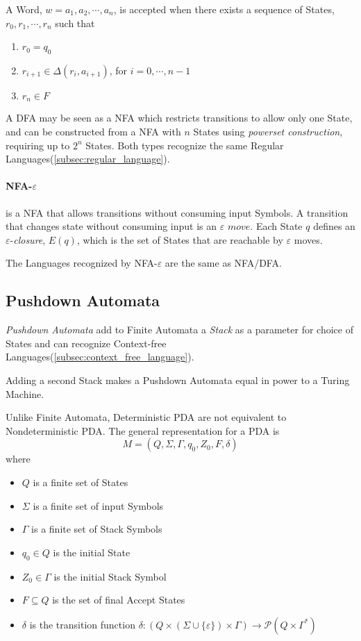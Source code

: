 \documentclass{article}
\begin{document}
A Word, $w=a_1,a_2,\cdots,a_n$, is accepted when there exists a
sequence of States, $r_0,r_1,\cdots,r_n$ such that
\begin{enumerate}
\item $r_0 = q_0$
\item $r_{i+1} \in \Delta(r_i, a_{i+1})$, for $i = 0, \cdots, n-1$
\item $r_n \in F$
\end{enumerate}

A DFA may be seen as a NFA which restricts transitions to allow only
one State, and can be constructed from a NFA with $n$ States using
\emph{powerset construction}, requiring up to $2^n$ States. Both types
recognize the same Regular Languages(\ref{subsec:regular_language}).

\paragraph{NFA-$\varepsilon$} is a NFA that allows transitions
without consuming input Symbols. A transition that changes state
without consuming input is an $\varepsilon$ $move$. Each State $q$
defines an $\varepsilon$-\emph{closure}, $E(q)$, which is the set of
States that are reachable by $\varepsilon$ moves.

The Languages recognized by NFA-$\varepsilon$ are the same as NFA/DFA.

\subsection{Pushdown Automata}\label{subsec:pushdown_automata}
\emph{Pushdown Automata} add to Finite Automata a \emph{Stack} as a
parameter for choice of States and can recognize Context-free
Languages(\ref{subsec:context_free_language}).

Adding a second Stack makes a Pushdown Automata equal in power to a
Turing Machine.

Unlike Finite Automata, Deterministic PDA are not equivalent to
Nondeterministic PDA. The general representation for a PDA is
\[
    M = (Q, \Sigma, \Gamma, q_0, Z_0, F, \delta)
\]
where
\begin{itemize}
\item $Q$ is a finite set of States
\item $\Sigma$ is a finite set of input Symbols
\item $\Gamma$ is a finite set of Stack Symbols
\item $q_0 \in Q$ is the initial State
\item $Z_0 \in \Gamma$ is the initial Stack Symbol
\item $F \subseteq Q$ is the set of final Accept States
\item $\delta$ is the transition function $\delta: (Q \times (\Sigma
  \cup \{\varepsilon\}) \times \Gamma) \rightarrow \mathcal{P}(Q \times
  \Gamma^*)$
\end{itemize}
\end{document}
